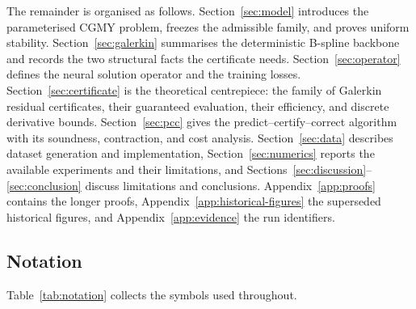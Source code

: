 \documentclass[11pt]{amsart}
\theoremstyle{remark}
\begin{document}
The remainder is organised as follows.  Section~\ref{sec:model} introduces the
parameterised CGMY problem, freezes the admissible family, and proves uniform
stability.  Section~\ref{sec:galerkin} summarises the deterministic B-spline
backbone and records the two structural facts the certificate needs.
Section~\ref{sec:operator} defines the neural solution operator and the
training losses.  Section~\ref{sec:certificate} is the theoretical
centrepiece: the family of Galerkin residual certificates, their guaranteed
evaluation, their efficiency, and discrete derivative bounds.
Section~\ref{sec:pcc} gives the predict--certify--correct algorithm with its
soundness, contraction, and cost analysis.  Section~\ref{sec:data} describes
dataset generation and implementation, Section~\ref{sec:numerics} reports the available experiments and their limitations, and Sections~\ref{sec:discussion}--\ref{sec:conclusion}
discuss limitations and conclusions.  Appendix~\ref{app:proofs} contains the
longer proofs, Appendix~\ref{app:historical-figures} the superseded historical
figures, and Appendix~\ref{app:evidence} the run identifiers.

\subsection*{Notation}

Table~\ref{tab:notation} collects the symbols used throughout.
\end{document}
